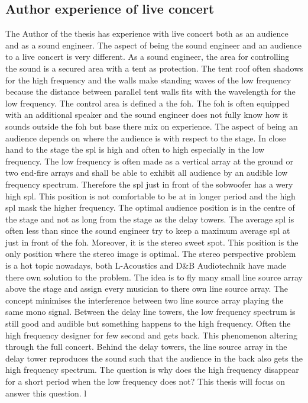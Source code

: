 \subsection{Author experience of live concert}\label{sec:ana:aut_exp_con}
The Author of the thesis has experience with live concert both as an audience and as a sound engineer. The aspect of being the sound engineer and an audience to a live concert is very different. As a sound engineer, the area for controlling the sound is a secured area with a tent as protection. The tent roof often shadows for the high frequency and the walls make standing waves of the low frequency because the distance between parallel tent walls fits with the wavelength for the low frequency. The control area is defined a the \gls{foh}. The \gls{foh} is often equipped with an additional speaker and the sound engineer does not fully know how it sounds outside the \gls{foh} but base there mix on experience. The aspect of being an audience depends on where the audience is with respect to the stage. In close hand to the stage the \gls{spl} is high and often to high especially in the low frequency. The low frequency is often made as a vertical array at the ground or two end-fire arrays and shall be able to exhibit all audience by an audible low frequency spectrum. Therefore the \gls{spl} just in front of the sobwoofer has a wery high \gls{spl}. This position is not comfortable to be at in longer period and the high \gls{spl} mask the higher frequency. The optimal audience position is in the centre of the stage and not as long from the stage as the delay towers. The average \gls{spl} is often less than  since the sound engineer try to keep a maximum average \gls{spl} at  just in front of the \gls{foh}. Moreover, it is the stereo sweet spot. This position is the only position where the stereo image is optimal. The stereo perspective problem is a hot topic nowadays, both L-Acoustics \citep{l_acoustics_l_isa} and D\&B Audiotechnik \citep{dbsoundscape} have made there own solution to the problem. The idea is to fly many small line source array above the stage and assign every musician to there own line source array. The concept minimises the interference between two line source array playing the same mono signal. 
Between the delay line towers, the low frequency spectrum is still good and audible but something happens to the high frequency. Often the high frequency designer for few second and gets back. This phenomenon altering through the full concert. Behind the delay towers, the line source array in the delay tower reproduces the sound such that the audience in the back also gets the high frequency spectrum. The question is why does the high frequency disappear for a short period when the low frequency does not? This thesis will focus on answer this question.
l 

 
